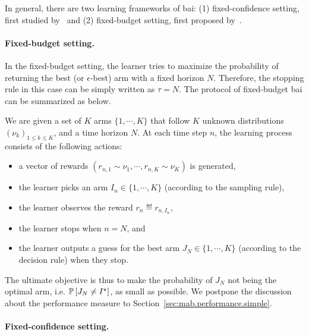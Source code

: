 In general, there are two learning frameworks of \gls{bai}: (1) \gls{fixed-confidence setting}, first studied by~\citep{even-dar2003confidence} and (2) \gls{fixed-budget setting}, first proposed by~\citep{audibert2010budget}.

\paragraph{Fixed-budget setting.}

In the fixed-budget setting, the learner tries to maximize the probability of returning the best (or $\epsilon$-best) arm with a fixed horizon $N$. Therefore, the stopping rule in this case can be simply written as $\tau=N$. The protocol of fixed-budget \gls{bai} can be summarized as below.

\begin{definition}\label{def:mab.bai_budget}
\begin{leftbar}[defnbar]
	We are given a set of $K$ arms $\{1,\cdots,K\}$ that follow $K$ unknown distributions $(\nu_k)_{1 \leq k \leq K}$, and a time horizon $N$. At each time step $n$, the learning process consists of the following actions:
\begin{itemize}
	\item a vector of rewards $(r_{n,1} \sim \nu_1, \cdots, r_{n,K} \sim \nu_K)$ is generated,
	\item the learner picks an arm $I_n \in \{1,\cdots,K\}$ (according to the sampling rule),
	\item the learner observes the reward $r_n \eqdef r_{n,I_n}$,
	\item the learner stops when $n=N$, and
	\item the learner outputs a guess for the best arm $J_N \in \{1,\cdots,K\}$ (according to the decision rule) when they stop.
\end{itemize}
\end{leftbar}
\end{definition}

The ultimate objective is thus to make the probability of $J_N$ not being the optimal arm, i.e. $\mathbb{P}\left[J_N\neq I^\star\right]$, as small as possible. We postpone the discussion about the performance measure to Section~\ref{sec:mab.performance.simple}.

\paragraph{Fixed-confidence setting.}

